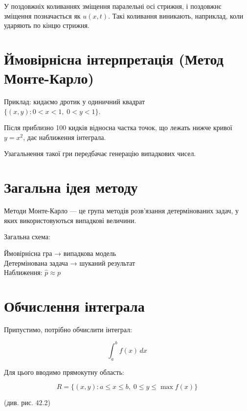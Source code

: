 \documentclass[
  ukrainian,
]{article}
\begin{document}
У поздовжніх коливаннях зміщення паралельні осі стрижня, і поздовжнє
зміщення позначається як \(u(x,t)\). Такі коливання виникають,
наприклад, коли ударяють по кінцю стрижня.

\section{Ймовірнісна інтерпретація (Метод
Монте-Карло)}\label{ux439ux43cux43eux432ux456ux440ux43dux456ux441ux43dux430-ux456ux43dux442ux435ux440ux43fux440ux435ux442ux430ux446ux456ux44f-ux43cux435ux442ux43eux434-ux43cux43eux43dux442ux435-ux43aux430ux440ux43bux43e}

Приклад: кидаємо дротик у одиничний квадрат\\
\(\{(x, y): 0 < x < 1,\; 0 < y < 1\}\).

Після приблизно 100 кидків відносна частка точок, що лежать нижче кривої
\(y = x^2\), дає наближення інтеграла.

Узагальнення такої гри передбачає генерацію випадкових чисел.

\section{Загальна ідея
методу}\label{ux437ux430ux433ux430ux43bux44cux43dux430-ux456ux434ux435ux44f-ux43cux435ux442ux43eux434ux443}

Методи Монте-Карло --- це група методів розв'язання детермінованих
задач, у яких використовуються випадкові величини.

Загальна схема:

Ймовірнісна гра → випадкова модель\\
Детермінована задача → шуканий результат\\
Наближення: \(\hat{p} \approx p\)

\section{Обчислення
інтеграла}\label{ux43eux431ux447ux438ux441ux43bux435ux43dux43dux44f-ux456ux43dux442ux435ux433ux440ux430ux43bux430}

Припустимо, потрібно обчислити інтеграл:

\[
\int_a^b f(x)\,dx
\]

Для цього вводимо прямокутну область:

\[
R = \{(x,y): a \le x \le b,\; 0 \le y \le \max f(x)\}
\]

(див. рис. 42.2)
\end{document}
